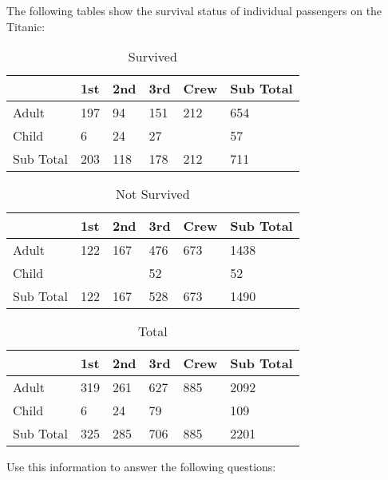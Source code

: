 \documentclass{homework}
\begin{document}
\newpage

\begin{problem}[6]
    The following tables show the survival status of individual passengers on the Titanic:

    \begin{table}[h]
        \centering
        \begin{tabular}{@{}l|l|l|l|l|l@{}}
            & 1st & 2nd & 3rd & Crew & Sub Total \\
            \midrule
            Adult     & 197 & 94  & 151 & 212  & 654       \\
            Child     & 6   & 24  & 27  &     & 57        \\
            \midrule
            Sub Total & 203 & 118 & 178 & 212  & 711      
        \end{tabular}
        \caption{Survived}
    \end{table}

    \begin{table}[h]
        \centering
        \begin{tabular}{@{}l|l|l|l|l|l@{}}
            & 1st & 2nd & 3rd & Crew & Sub Total \\
            \midrule
            Adult     & 122 & 167  & 476 & 673  & 1438       \\
            Child     &    &   & 52  &    & 52        \\
            \midrule
            Sub Total & 122 & 167 & 528 & 673  & 1490      
        \end{tabular}
        \caption{Not Survived}
    \end{table}

    \begin{table}[h]
        \centering
        \begin{tabular}{@{}l|l|l|l|l|l@{}}
            & 1st & 2nd & 3rd & Crew & Sub Total \\
            \midrule
            Adult     & 319 & 261  & 627 & 885  & 2092       \\
            Child     & 6   & 24  & 79  &     & 109        \\
            \midrule
            Sub Total & 325 & 285 & 706 & 885  & 2201      
        \end{tabular}
        \caption{Total}
    \end{table}

    Use this information to answer the following questions: 


\end{problem}
\end{document}
